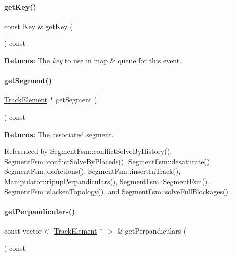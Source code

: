 \paragraph{\texorpdfstring{get\+Key()}{getKey()}}
{\footnotesize\ttfamily const \hyperlink{classKite_1_1RoutingEvent_1_1Key}{Key} \& get\+Key (\begin{DoxyParamCaption}{ }\end{DoxyParamCaption}) const\hspace{0.3cm}{\ttfamily [inline]}}

{\bfseries Returns\+:} The {\itshape key} to use in map \& queue for this event. \mbox{\label{classKite_1_1RoutingEvent_a506a4d1cef59fc35984c1c88e0c0f6df}} 
\paragraph{\texorpdfstring{get\+Segment()}{getSegment()}}
{\footnotesize\ttfamily \hyperlink{classKite_1_1TrackElement}{Track\+Element} $\ast$ get\+Segment (\begin{DoxyParamCaption}{ }\end{DoxyParamCaption}) const\hspace{0.3cm}{\ttfamily [inline]}}

{\bfseries Returns\+:} The associated segment. 

Referenced by Segment\+Fsm\+::conflict\+Solve\+By\+History(), Segment\+Fsm\+::conflict\+Solve\+By\+Placeds(), Segment\+Fsm\+::desaturate(), Segment\+Fsm\+::do\+Actions(), Segment\+Fsm\+::insert\+In\+Track(), Manipulator\+::ripup\+Perpandiculars(), Segment\+Fsm\+::\+Segment\+Fsm(), Segment\+Fsm\+::slacken\+Topology(), and Segment\+Fsm\+::solve\+Full\+Blockages().

\mbox{\label{classKite_1_1RoutingEvent_ab7d24e13f7b2c62cedce1fda2da7b7f5}} 
\paragraph{\texorpdfstring{get\+Perpandiculars()}{getPerpandiculars()}}
{\footnotesize\ttfamily const vector$<$ \hyperlink{classKite_1_1TrackElement}{Track\+Element} $\ast$ $>$ \& get\+Perpandiculars (\begin{DoxyParamCaption}{ }\end{DoxyParamCaption}) const\hspace{0.3cm}{\ttfamily [inline]}}

